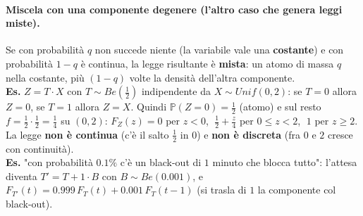 \documentclass[12pt]{extarticle} %
\begin{document}
\paragraph{Miscela con una componente degenere (l'altro caso che genera leggi miste).} Se con probabilità $q$ non succede niente (la variabile vale una \textbf{costante}) e con probabilità $1-q$ è continua, la legge risultante è \textbf{mista}: un atomo di massa $q$ nella costante, più $(1-q)$ volte la densità dell'altra componente.
{\footnotesize \\ \textbf{Es.} $Z = T\!\cdot\!X$ con $T \sim Be(\frac12)$ indipendente da $X \sim Unif(0,2)$: se $T=0$ allora $Z=0$, se $T=1$ allora $Z=X$. Quindi $\mathbb{P}(Z=0) = \frac12$ (atomo) e sul resto $f = \frac12 \cdot \frac12 = \frac14$ su $(0,2)$: \; $F_Z(z) = 0$ per $z<0$, $\;\frac12 + \frac{z}{4}$ per $0 \le z < 2$, $\;1$ per $z \ge 2$. La legge \textbf{non è continua} (c'è il salto $\frac12$ in $0$) e \textbf{non è discreta} (fra $0$ e $2$ cresce con continuità). \\
\textbf{Es.} "con probabilità $0.1\%$ c'è un black-out di $1$ minuto che blocca tutto": l'attesa diventa $T' = T + 1\cdot B$ con $B \sim Be(0.001)$, e $F_{T'}(t) = 0.999\,F_T(t) + 0.001\,F_T(t-1)$ (si trasla di $1$ la componente col black-out).}
\end{document}
